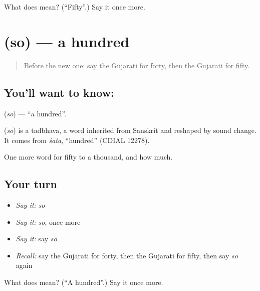 \begin{tcolorbox}[breakable,colback=teal!4,colframe=teal!35!black,title={Before you move on}]
What does  mean? (\textquotedblleft{}Fifty\textquotedblright{}.) Say it once more.
\end{tcolorbox}
\section[\texorpdfstring{\gu{સો} (so)}{સો (so)}]{ (so) — a hundred}

\label{lesson:GU-C83-hundred}



\begin{quote}
Before the new one: say the Gujarati for forty, then the Gujarati for fifty.
\end{quote}

\subsection*{You'll want to know: }
\textbf{} (\emph{so}) — \textquotedblleft{}a hundred\textquotedblright{}.

\begin{cousinweb}
\textbf{} (\emph{so}) is a tadbhava, a word inherited from Sanskrit and reshaped by sound change. It comes from \emph{śata}, \textquotedblleft{}hundred\textquotedblright{} (CDIAL 12278).
\end{cousinweb}

\begin{grammarlens}[title={What you've built}]
One more word for fifty to a thousand, and how much.
\end{grammarlens}

\subsection*{Your turn}
\begin{itemize}
\raggedright
  \item \emph{Say it:} \emph{so}
  \item \emph{Say it:} \emph{so}, once more
  \item \emph{Say it:} say \emph{so}
  \item \emph{Recall:} say the Gujarati for forty, then the Gujarati for fifty, then say \emph{so} again
\end{itemize}

\begin{tcolorbox}[breakable,colback=teal!4,colframe=teal!35!black,title={Before you move on}]
What does  mean? (\textquotedblleft{}A hundred\textquotedblright{}.) Say it once more.
\end{tcolorbox}
